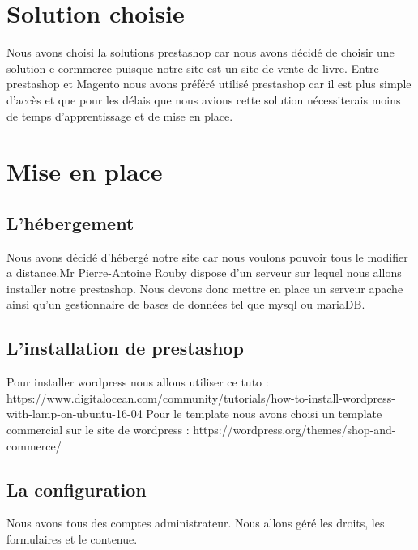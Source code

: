 \documentclass[a4paper,12pt]{report}
\begin{document}
\chapter{Solution choisie}

Nous avons choisi la solutions prestashop car nous avons décidé de choisir
une solution e-cormmerce puisque notre site est un site de vente de livre.
Entre prestashop et Magento nous avons préféré utilisé prestashop car il est
plus simple d'accès et que pour les délais que nous avions cette solution
nécessiterais moins de temps d'apprentissage et de mise en place.

\chapter{Mise en place}
\section{L'hébergement}

Nous avons décidé d’hébergé notre site car nous voulons pouvoir tous le
modifier a distance.Mr Pierre-Antoine Rouby dispose d'un serveur sur lequel
nous allons installer notre prestashop. Nous devons donc mettre en place
un serveur apache ainsi qu'un gestionnaire de bases de données tel que mysql ou mariaDB.

\section{L'installation de prestashop}

Pour installer wordpress nous allons utiliser ce tuto :
https://www.digitalocean.com/community/tutorials/how-to-install-wordpress-with-lamp-on-ubuntu-16-04
Pour le template nous avons choisi un template commercial sur le site
de wordpress : https://wordpress.org/themes/shop-and-commerce/

\section{La configuration}

Nous avons tous des comptes administrateur.
Nous allons géré les droits, les formulaires et le contenue. 
\end{document}
